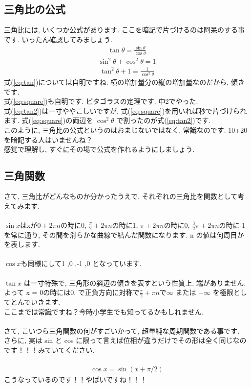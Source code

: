 \documentclass[11pt,a4paper]{jreport}
\begin{document}
\subsection{三角比の公式}
三角比には, いくつか公式があります. ここを暗記で片づけるのは阿呆のする事です. いったん確認してみましょう.
\begin{eqnarray}
\tan \theta = \frac{\sin\theta}{\cos\theta}
\label{eq:tan}
\end{eqnarray}
\begin{eqnarray}
\sin^2 \theta + \cos^2\theta = 1
\label{eq:square}
\end{eqnarray}
\begin{eqnarray}
\tan^2\theta + 1 = \frac{1}{\cos^2\theta}
\label{eq:tan2}
\end{eqnarray}
式(\ref{eq:tan})については自明ですね. 横の増加量分の縦の増加量なのだから, 傾きです.\\
式(\ref{eq:square})も自明です. ピタゴラスの定理です. 中2でやった. \\
式(\ref{eq:tan2})は一寸ややこしいですが, 式(\ref{eq:square})を用いれば秒で片づけられます. 式(\ref{eq:square})の両辺を $\cos^2\theta$ で割ったのが式(\ref{eq:tan2})です.\\
このように, 三角比の公式というのはおまじないではなく, 常識なのです. 10+20を暗記する人はいませんね？\\
感覚で理解し, すぐにその場で公式を作れるようにしましょう. 



\subsection{三角関数}
さて, 三角比がどんなものか分かったうえで, それぞれの三角比を関数として考えてみます.\\
\\
 $\sin x $はxが$0 + 2\pi n$の時に0, $\frac{\pi}{2} + 2\pi n$の時に1, $\pi + 2\pi n$の時に0, $\frac{3}{2}\pi + 2\pi n$の時に-1を常に通り, その間を滑らかな曲線で結んだ関数になります. n の値は何周目かを表します.\\
\\
$\cos x $も同様にして1 ,0 ,-1 ,0 となっています. \\
\\
$\tan x$ は一寸特殊で, 三角形の斜辺の傾きを表すという性質上, 端がありません. よって x = 0の時には0, で正負方向に対称で$\frac{\pi}{2} + \pi n$で$\infty$ または $-\infty$ を極限としてとんでいきます.\\


ここまでは常識ですね？今時小学生でも知ってるかもしれません.\\
\\
さて, こいつら三角関数の何がすごいかって, 超単純な周期関数である事です. \\
さらに, 実は sin と cos に限って言えば位相が違うだけでその形は全く同じなのです！！！みていてください.\\
\\
\begin{eqnarray}
\cos x = \sin (x + \pi/2)
\end{eqnarray}
こうなっているのです！！やばいですね！！！
\\
\end{document}
